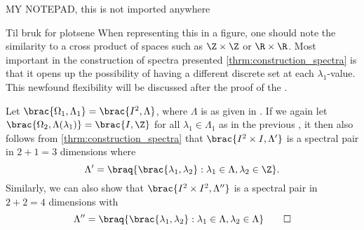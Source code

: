 


MY NOTEPAD, this is not imported anywhere


Til bruk for plotsene
When representing this in a figure, one should note the similarity to a cross product of spaces such as $\Z \times \Z$ or $\R \times \R$. Most important in the construction of spectra presented \cref{thrm:construction_spectra} is that it opens up the possibility of having a different discrete set at each $\lambda_1$-value. This newfound flexibility will be discussed after the proof of the .






\begin{example}\label{exmp:second_construction}
    Let $\brac{\Omega_1,\Lambda_1} = \brac{I^2, \Lambda}$, where $\Lambda$ is as given in . If we again let 
    $\brac{\Omega_2,\Lambda(\lambda_1)} = \brac{I, \Z}$ for all $\lambda_1 \in \Lambda_1$ as in the previous , it then also follows from \cref{thrm:construction_spectra} that $\brac{I^2 \times I, \Lambda'}$ is a spectral pair in $2+1=3$ dimensions where 
    \begin{equation*}
        \Lambda'=\braq{\brac{\lambda_1,\lambda_2}: \lambda_1 \in \Lambda, \lambda_2 \in \Z }.
    \end{equation*}
    Similarly, we can also show that $\brac{I^2 \times I^2, \Lambda''}$ is a spectral pair in $2+2=4$ dimensions with
    \begin{equation*}
        \Lambda''=\braq{\brac{\lambda_1,\lambda_2}: \lambda_1 \in \Lambda, \lambda_2 \in \Lambda} \qedhere
    \end{equation*}
\end{example}




